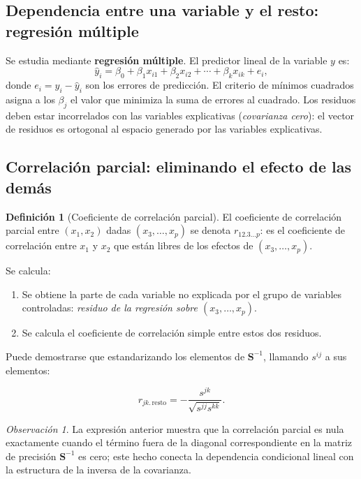 \documentclass[12pt, a4paper]{article}
\theoremstyle{plain}
\theoremstyle{definition}
\newtheorem{definicion}[teorema]{Definición}
\theoremstyle{remark}
\newtheorem*{observacion}{Observación}
\newcommand{\mat}[1]{\mathbf{#1}}
\begin{document}
\subsection{Dependencia entre una variable y el resto: regresión múltiple}

Se estudia mediante \textbf{regresión múltiple}. El predictor lineal de la
variable $y$ es:
\[
  \hat{y}_i = \beta_0 + \beta_1 x_{i1} + \beta_2 x_{i2} + \cdots + \beta_k x_{ik} + e_i,
\]
donde $e_i = y_i - \hat{y}_i$ son los errores de predicción. El criterio de
mínimos cuadrados asigna a los $\beta_j$ el valor que minimiza la suma de
errores al cuadrado. Los residuos deben estar incorrelados con las variables
explicativas (\emph{covarianza cero}): el vector de residuos es ortogonal al
espacio generado por las variables explicativas.

\subsection{Correlación parcial: eliminando el efecto de las demás}

\begin{definicion}[Coeficiente de correlación parcial]
El coeficiente de correlación parcial entre $(x_1,x_2)$ dadas
$(x_3,\dots,x_p)$ se denota $r_{12.3\dots p}$: es el coeficiente de
correlación entre $x_1$ y $x_2$ que están libres de los efectos de
$(x_3,\dots,x_p)$.

Se calcula:
\begin{enumerate}[label=\alph*)]
  \item Se obtiene la parte de cada variable no explicada por el grupo de
        variables controladas: \emph{residuo de la regresión sobre
        $(x_3,\dots,x_p)$}.
  \item Se calcula el coeficiente de correlación simple entre estos dos
        residuos.
\end{enumerate}
Puede demostrarse que estandarizando los elementos de $\mat{S}^{-1}$, llamando
$s^{ij}$ a sus elementos:
\begin{mdframed}[style=resultado]
\[
  r_{jk.\,\text{resto}} = -\frac{s^{jk}}{\sqrt{s^{jj}s^{kk}}}.
\]
\end{mdframed}
\end{definicion}

\begin{observacion}
La expresión anterior muestra que la correlación parcial es nula exactamente
cuando el término fuera de la diagonal correspondiente en la matriz de
precisión $\mat{S}^{-1}$ es cero; este hecho conecta la dependencia condicional
lineal con la estructura de la inversa de la covarianza.
\end{observacion}
\end{document}

